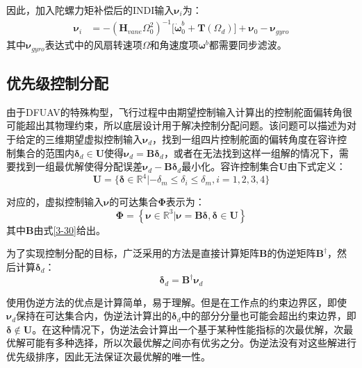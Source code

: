 因此，加入陀螺力矩补偿后的INDI输入$\boldsymbol{\nu}_i$为：
\begin{equation}
    \begin{aligned}
        \boldsymbol{\nu}_i&=-(\boldsymbol{H}_{vane}\Omega_0^2)^{-1} \big[\boldsymbol{\dot{\omega}}_0^b+\boldsymbol{T}(\Omega_d)\big]+\boldsymbol{\nu}_0-\boldsymbol{\nu}_{gyro}
    \end{aligned}
    \label{3-54}
\end{equation}
其中$\boldsymbol{\nu}_{gyro}$表达式中的风扇转速项$\Omega$和角速度项$\boldsymbol{\omega}^b$都需要同步滤波。

\subsection{优先级控制分配}

由于DFUAV的特殊构型，飞行过程中由期望控制输入计算出的控制舵面偏转角很可能超出其物理约束，所以底层设计用于解决控制分配问题。该问题可以描述为对于给定的三维期望虚拟控制输入$\boldsymbol{\nu}_d$，找到一组四片控制舵面的偏转角度在容许控制集合的范围内$\boldsymbol{\delta}_d\in \boldsymbol{U}$使得$\boldsymbol{\nu}_d=\boldsymbol{B}\boldsymbol{\delta}_d$，或者在无法找到这样一组解的情况下，需要找到一组最优解使得分配误差$\boldsymbol{\nu}_d-\boldsymbol{B}\boldsymbol{\delta}_d$最小化。容许控制集合$\boldsymbol{U}$由下式定义：
\begin{equation}
    \boldsymbol{U}=\{\boldsymbol{\delta}\in\mathbb{R}^4|-\delta_m\leq\delta_i\leq\delta_m,i=1,2,3,4\}
    \label{3-55}
\end{equation}

对应的，虚拟控制输入$\boldsymbol{\nu}$的可达集合$\boldsymbol\Phi$表示为：
\begin{equation}
    \boldsymbol\Phi=\left\{\boldsymbol{\nu}\in\mathbb{R}^3|\boldsymbol{\nu}=\boldsymbol{B}\boldsymbol{\delta},\boldsymbol{\delta}\in \boldsymbol{U}\right\}
    \label{3-56}
\end{equation}
其中$\boldsymbol{B}$由式\eqref{3-30}给出。

为了实现控制分配的目标，广泛采用的方法是直接计算矩阵$\boldsymbol{B}$的伪逆矩阵$\boldsymbol{B}^{\dagger}$，然后计算$\boldsymbol{\delta}_d$：
\begin{equation}
    \boldsymbol{\delta}_d=\boldsymbol{B}^{\dagger}\boldsymbol{\nu}_d
    \label{3-57}
\end{equation}

使用伪逆方法的优点是计算简单，易于理解。但是在工作点的约束边界区，即使$\boldsymbol{\nu}_d$保持在可达集合内，伪逆法计算出的$\boldsymbol{\delta}_d$中的部分分量也可能会超出约束边界，即$\boldsymbol{\delta}\notin\boldsymbol{U}$。在这种情况下，伪逆法会计算出一个基于某种性能指标的次最优解，次最优解可能有多种选择，所以次最优解之间亦有优劣之分。伪逆法没有对这些解进行优先级排序，因此无法保证次最优解的唯一性。

